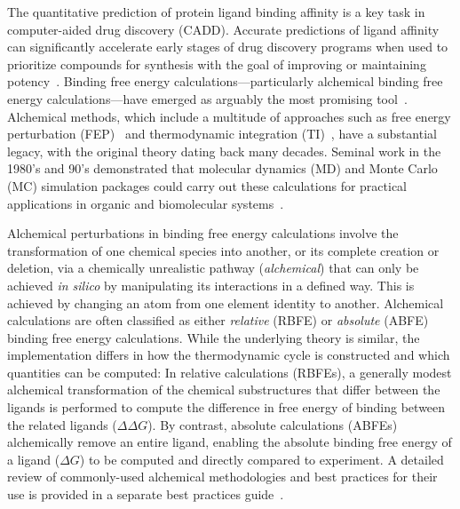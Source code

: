 \documentclass[9pt,bestpractices]{livecoms}
\begin{document}
The quantitative prediction of protein ligand binding affinity is a key task in computer-aided drug discovery (CADD). 
Accurate predictions of ligand affinity can significantly accelerate early stages of drug discovery programs when used to prioritize compounds for synthesis with the goal of improving or maintaining potency~\cite{abelCriticalReviewValidation2017,abelModelingValuePredictive2018}. 
Binding free energy calculations---particularly alchemical binding free energy calculations---have emerged as arguably the most promising tool~\cite{courniaRelativeBindingFree2017}. 
Alchemical methods, which include a multitude of approaches such as free energy perturbation (FEP)~\cite{zwanzigHighTemperatureEquation1954,bennettEfficientEstimationFree1976} and thermodynamic integration (TI)~\cite{kirkwoodQuantumStatisticsAlmost1933,kirkwoodQuantumStatisticsAlmost1934,kirkwoodStatisticalMechanicsFluid1935}, have a substantial legacy, with the original theory dating back many decades. 
Seminal work in the 1980’s and 90’s demonstrated that molecular dynamics (MD) and Monte Carlo (MC) simulation packages could carry out these calculations for practical applications in organic and biomolecular systems~\cite{jorgensenMonteCarloSimulation1985,straatsmaFreeEnergyHydrophobic1986,lybrandTheoreticalCalculationRelative1986,merzFreeEnergyPerturbation1989,pearlmanDeterminationDifferentialEffects1995,choderaAlchemicalFreeEnergy2011,mobleyPerspectiveAlchemicalFree2012}. 

Alchemical perturbations in binding free energy calculations involve the transformation of one chemical species into another, or its complete creation or deletion, via a chemically unrealistic pathway (\emph{alchemical}) that can only be achieved \textit{in silico} by manipulating its interactions in a defined way. This is achieved by changing an atom from one element identity to another.
Alchemical calculations are often classified as either \emph{relative} (RBFE) or \emph{absolute} (ABFE) binding free energy calculations. 
While the underlying theory is similar, the implementation differs in how the thermodynamic cycle is constructed and which quantities can be computed:
In relative calculations (RBFEs), a generally modest alchemical transformation of the chemical substructures that differ between the ligands is performed to compute the difference in free energy of binding between the related ligands ($\Delta \Delta G$).
By contrast, absolute calculations (ABFEs) alchemically remove an entire ligand, enabling the absolute binding free energy of a ligand ($\Delta G$) to be computed and directly compared to experiment.
A detailed review of commonly-used alchemical methodologies and best practices for their use is provided in a separate best practices guide~\cite{meyBestPracticesAlchemical2020}.
\end{document}
